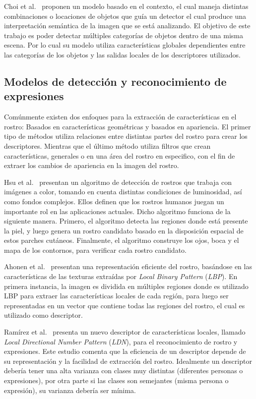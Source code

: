 Choi et al.~\cite{treebased2012} proponen un modelo basado en el contexto, el cual maneja distintas combinaciones o locaciones de objetos que guía un detector el cual produce una interpretación semántica de la imagen que se está analizando. El objetivo de este trabajo es poder detectar múltiples categorías de objetos dentro de una misma escena. Por lo cual su modelo utiliza características globales dependientes entre las categorías de los objetos y las salidas locales de los descriptores utilizados.

\subsection{Modelos de detección y reconocimiento de expresiones}
Comúnmente existen dos enfoques para la extracción de características en el rostro: Basados en características geométricas y basados en apariencia. El primer tipo de métodos utiliza relaciones entre distintas partes del rostro para crear los descriptores. Mientras que el último método utiliza filtros que crean características, generales o en una área del rostro en especifico, con el fin de extraer los cambios de apariencia en la imagen del rostro.

Hsu et al.~\cite{Hsu2002} presentan un algoritmo de detección de rostros que trabaja con imágenes a color, tomando en cuenta distintas condiciones de luminosidad, así como fondos complejos. Ellos definen que los rostros humanos juegan un importante rol en las aplicaciones actuales. Dicho algoritmo funciona de la siguiente manera. Primero, el algoritmo detecta las regiones donde está presente la piel, y luego genera un rostro candidato basado en la disposición espacial de estos parches cutáneos. Finalmente, el algoritmo construye los ojos, boca y el mapa de los contornos, para verificar cada rostro candidato.

Ahonen et al.~\cite{ahonen2006} presentan una representación eficiente del rostro, basándose en las características de las texturas extraídas por \textit{Local Binary Pattern} (\textit{LBP}). En primera instancia, la imagen es dividida en múltiples regiones donde es utilizado LBP para extraer las características locales de cada región, para luego ser representadas en un vector que contiene todas las regiones del rostro, el cual es utilizado como descriptor.

Ramírez et al.~\cite{ldnp2013} presenta un nuevo descriptor de características locales, llamado \textit{Local Directional Number Pattern} (\textit{LDN}), para el reconocimiento de rostro y expresiones. Este estudio comenta que la eficiencia de un descriptor depende de su representación y la facilidad de extracción del rostro. Idealmente un descriptor debería tener una alta varianza con clases muy distintas (diferentes personas o expresiones), por otra parte si las clases son semejantes (misma persona o expresión), su varianza debería ser mínima.

